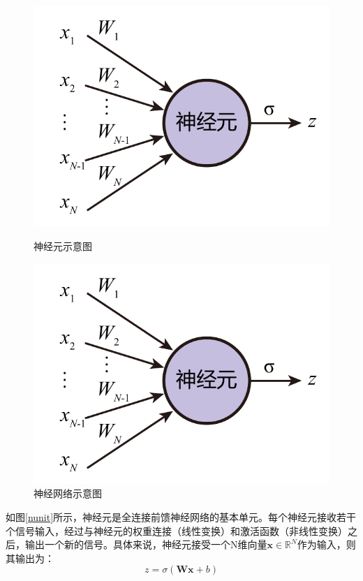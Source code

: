 \begin{figure}
    \centering
    \begin{minipage}[b]{0.48\linewidth}
        \includegraphics[page=1,width=0.9\linewidth]{figure/figures.pdf}
        \caption{神经元示意图}
        \label{nunit}
    \end{minipage}
    \begin{minipage}[b]{0.48\linewidth}
        \includegraphics[page=2,width=0.9\linewidth]{figure/figures.pdf}
        \caption{神经网络示意图}
        \label{nnet}
    \end{minipage}
\end{figure}

如图\ref{nunit}所示，神经元是全连接前馈神经网络的基本单元。每个神经元接收若干个信号输入，经过与神经元的权重连接（线性变换）和激活函数（非线性变换）之后，输出一个新的信号。具体来说，神经元接受一个N维向量$\bm{x}\in\mathbb{R}^N$作为输入，则其输出为：
\begin{equation}
    z=\sigma\left(\bm{W}\bm{x}+b\right)
\end{equation}

